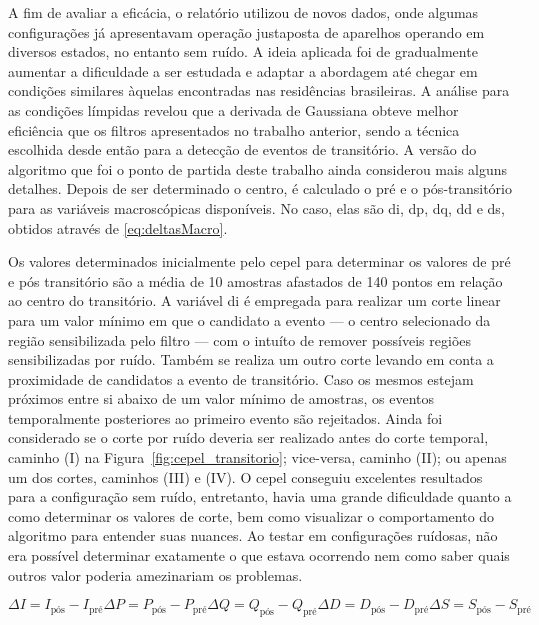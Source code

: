 A fim de avaliar a eficácia, o relatório utilizou de novos dados, onde
algumas configurações já apresentavam operação justaposta de aparelhos
operando em diversos estados, no entanto sem ruído. A ideia aplicada
foi de gradualmente aumentar a dificuldade a ser estudada e adaptar a
abordagem até chegar em condições similares àquelas encontradas nas
residências brasileiras. A análise para as condições límpidas revelou
que a derivada de Gaussiana obteve melhor eficiência que os filtros
apresentados no trabalho anterior, sendo a técnica escolhida desde
então para a detecção de eventos de transitório.  A versão do
algoritmo que foi o ponto de partida deste trabalho ainda considerou
mais alguns detalhes. Depois de ser determinado o centro, é calculado
o pré e o pós-transitório para as variáveis macroscópicas disponíveis.
No caso, elas são \acf{di}, \acf{dp}, \acf{dq}, \acf{dd} e \acf{ds},
obtidos através de \ref{eq:deltasMacro}.

Os valores determinados inicialmente pelo \gls{cepel} para determinar
os valores de pré e pós transitório são a média de 10 amostras
afastados de 140 pontos em relação ao centro do transitório. A
variável \acs{di} é empregada para realizar um corte linear para um
valor mínimo em que o candidato a evento --- o centro selecionado da
região sensibilizada pelo filtro --- com o intuíto de remover
possíveis regiões sensibilizadas por ruído. Também se realiza um outro
corte levando em conta a proximidade de candidatos a evento de
transitório. Caso os mesmos estejam próximos entre si abaixo de um
valor mínimo de amostras, os eventos temporalmente posteriores ao
primeiro evento são rejeitados. Ainda foi considerado se o corte por
ruído deveria ser realizado antes do corte temporal, caminho (I) na
Figura~\ref{fig:cepel_transitorio}; vice-versa, caminho (II); ou
apenas um dos cortes, caminhos (III) e (IV). O \gls{cepel} conseguiu
excelentes resultados para a configuração sem ruído, entretanto, havia
uma grande dificuldade quanto a como determinar os valores de corte,
bem como visualizar o comportamento do algoritmo para entender suas
nuances. Ao testar em configurações ruídosas, não era possível
determinar exatamente o que estava ocorrendo nem como saber quais
outros valor poderia amezinariam os problemas.

\begin{subequations} \label{eq:deltasMacro}
\begin{equation} \label{eq:dI}
\Delta I = I_{\text{pós}} - I_{\text{pré}}
\end{equation}
\begin{equation} \label{eq:dP}
\Delta P = P_{\text{pós}} - P_{\text{pré}}
\end{equation}
\begin{equation} \label{eq:dQ}
\Delta Q = Q_{\text{pós}} - Q_{\text{pré}}
\end{equation}
\begin{equation} \label{eq:dD}
\Delta D = D_{\text{pós}} - D_{\text{pré}}
\end{equation}
\begin{equation} \label{eq:dS}
\Delta S = S_{\text{pós}} - S_{\text{pré}}
\end{equation}
\end{subequations}


